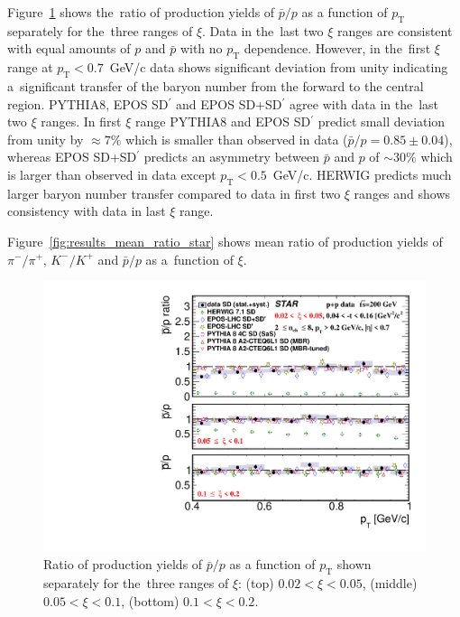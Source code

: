 Figure~\ref{fig:results_star_proton} shows the~ratio of production yields of $\bar{p}/p$ as a function of $p_\textrm{T}$  separately for the~three ranges of $\xi$. Data in the~last two $\xi$ ranges are consistent with equal amounts of $p$ and $\bar{p}$ with no $p_\textrm{T}$ dependence. However, in the~first $\xi$ range at $p_\textrm{T}<0.7$~GeV/c data shows significant deviation from unity indicating a~significant transfer of the baryon number from the forward to the central region. PYTHIA8, EPOS SD$^\prime$ and EPOS SD+SD$^\prime$ agree with data in the~last two $\xi$ ranges. In first $\xi$ range PYTHIA8 and EPOS SD$^\prime$ predict small deviation from unity by $\approx7\%$ which is smaller than observed in data ($\bar{p}/p=0.85\pm 0.04$), whereas EPOS SD+SD$^\prime$ predicts an asymmetry between $\bar{p}$ and $p$ of $\sim30\%$  which is larger than observed in data except $p_\textrm{T}<0.5$~GeV/c. HERWIG predicts much larger baryon number transfer compared to data in first two $\xi$ ranges and shows consistency with data in last $\xi$ range. 

Figure~\ref{fig:results_mean_ratio_star} shows mean ratio of production yields of $\pi^-/\pi^+$, $K^-/K^+$ and $\bar{p}/p$ as a~function of  $\xi$.

\begin{figure}[b!]
	\centering
	\includegraphics[width=.99\textwidth,page=1]{chapters/chrgSTAR/img/results/particleRatio_prt_2.pdf}
	\caption{Ratio of production yields of $\bar{p}/p$ as a function of $p_\textrm{T}$ shown separately for the~three ranges of $\xi$: (top) $0.02<\xi<0.05$, (middle) $0.05<\xi<0.1$, (bottom) $0.1<\xi<0.2$.}
	\label{fig:results_star_proton}
	
\end{figure}

